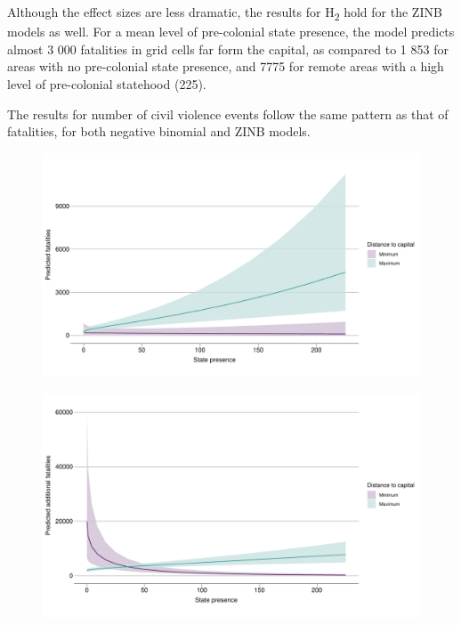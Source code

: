 \documentclass[12pt]{article}
\begin{document}
Although the effect sizes are less dramatic, the results for H\textsubscript{2}
hold for the ZINB models as well. For a mean level of pre-colonial state
presence, the model predicts almost 3 000 fatalities in grid cells far form the
capital, as compared to 1 853 for areas with no pre-colonial state presence, and
7775 for remote areas with a high level of pre-colonial statehood (225).

The results for number of civil violence events follow the same pattern as that
of fatalities, for both negative binomial and ZINB models.


\begin{figure}[htpb] \centering
	\includegraphics[width=\linewidth]{"../R/Output/deathsInterPlot.pdf"}
	\caption{}
	\label{interdeaths}
\end{figure}

\begin{figure}[htpb]
	\centering
	\includegraphics[width=\linewidth]{"../R/Output/interdeathszinbplot.pdf"}
	\caption{}
	\label{deaths_zinb}
\end{figure}
\end{document}
